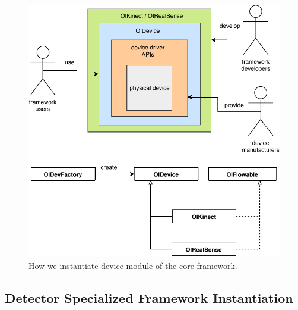 \begin{figure}
    \centering
    \includegraphics[scale=0.8]{figures/framework_inst_device.pdf}
    \caption{How we instantiate device module of the core framework.}
    \label{fig:fw-inst-device}
\end{figure}

\subsection{Detector Specialized Framework Instantiation}
\label{sec:fw-inst-detector}


